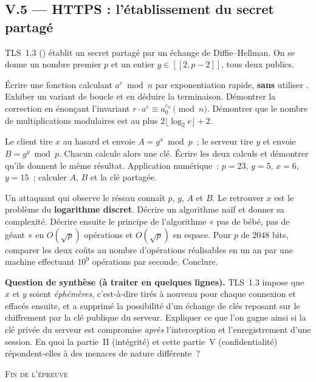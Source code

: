 \documentclass[11pt,a4paper]{article}
\begin{document}
\subsection*{V.5 --- HTTPS : l'établissement du secret partagé}

TLS~1.3 () établit un secret partagé par un échange de Diffie--Hellman. On se
donne un nombre premier $p$ et un entier $g\in[\![2,p-2]\!]$, tous deux publics.

\Q Écrire une fonction  calculant $a^{e}\bmod n$ par
exponentiation rapide, \textbf{sans} utiliser . Exhiber un variant de
boucle et en déduire la terminaison. Démontrer la correction en énonçant l'invariant
$r\cdot a^{e}\equiv a_0^{e_0}\pmod n$. Démontrer que le nombre de multiplications modulaires
est au plus $2\lfloor\log_2 e\rfloor+2$.

\Q Le client tire $x$ au hasard et envoie $A=g^{x}\bmod p$~; le serveur tire $y$ et envoie
$B=g^{y}\bmod p$. Chacun calcule alors une clé. Écrire les deux calculs et démontrer qu'ils
donnent le même résultat. Application numérique~: $p=23$, $g=5$, $x=6$, $y=15$~; calculer
$A$, $B$ et la clé partagée.

\Q Un attaquant qui observe le réseau connaît $p$, $g$, $A$ et $B$. Le retrouver $x$ est le
problème du \textbf{logarithme discret}. Décrire un algorithme naïf et donner sa complexité.
Décrire ensuite le principe de l'algorithme « pas de bébé, pas de géant » en $O(\sqrt{p})$
opérations et $O(\sqrt{p})$ en espace. Pour $p$ de $2048$ bits, comparer les deux coûts au
nombre d'opérations réalisables en un an par une machine effectuant $10^{9}$ opérations par
seconde. Conclure.

\Q \textbf{Question de synthèse (à traiter en quelques lignes).} TLS~1.3 impose que $x$ et
$y$ soient \emph{éphémères}, c'est-à-dire tirés à nouveau pour chaque connexion et effacés
ensuite, et a supprimé la possibilité d'un échange de clés reposant sur le chiffrement par la
clé publique du serveur. Expliquer ce que l'on gagne ainsi si la clé privée du serveur est
compromise \emph{après} l'interception et l'enregistrement d'une session. En quoi la partie~II
(intégrité) et cette partie~V (confidentialité) répondent-elles à des menaces de nature
différente~?

\vfill
\begin{center}\small\textsc{Fin de l'épreuve}\end{center}
\end{document}
